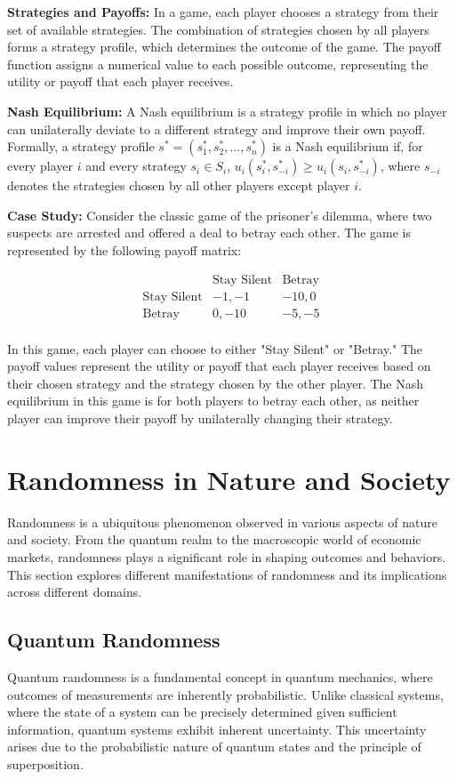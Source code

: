 \documentclass[12pt]{book} %
\begin{document}
\textbf{Strategies and Payoffs:} In a game, each player chooses a strategy from their set of available strategies. The combination of strategies chosen by all players forms a strategy profile, which determines the outcome of the game. The payoff function assigns a numerical value to each possible outcome, representing the utility or payoff that each player receives.

\textbf{Nash Equilibrium:} A Nash equilibrium is a strategy profile in which no player can unilaterally deviate to a different strategy and improve their own payoff. Formally, a strategy profile \(s^* = (s_1^*, s_2^*, \dots, s_n^*)\) is a Nash equilibrium if, for every player \(i\) and every strategy \(s_i \in S_i\), \(u_i(s_i^*, s_{-i}^*) \geq u_i(s_i, s_{-i}^*)\), where \(s_{-i}\) denotes the strategies chosen by all other players except player \(i\).

\textbf{Case Study:} Consider the classic game of the prisoner's dilemma, where two suspects are arrested and offered a deal to betray each other. The game is represented by the following payoff matrix:

\[
\begin{array}{c|cc}
 & \text{Stay Silent} & \text{Betray} \\
\hline
\text{Stay Silent} & -1, -1 & -10, 0 \\
\text{Betray} & 0, -10 & -5, -5 \\
\end{array}
\]

In this game, each player can choose to either "Stay Silent" or "Betray." The payoff values represent the utility or payoff that each player receives based on their chosen strategy and the strategy chosen by the other player. The Nash equilibrium in this game is for both players to betray each other, as neither player can improve their payoff by unilaterally changing their strategy.


\section{Randomness in Nature and Society}
Randomness is a ubiquitous phenomenon observed in various aspects of nature and society. From the quantum realm to the macroscopic world of economic markets, randomness plays a significant role in shaping outcomes and behaviors. This section explores different manifestations of randomness and its implications across different domains.

\subsection{Quantum Randomness}
Quantum randomness is a fundamental concept in quantum mechanics, where outcomes of measurements are inherently probabilistic. Unlike classical systems, where the state of a system can be precisely determined given sufficient information, quantum systems exhibit inherent uncertainty. This uncertainty arises due to the probabilistic nature of quantum states and the principle of superposition.
\end{document}
